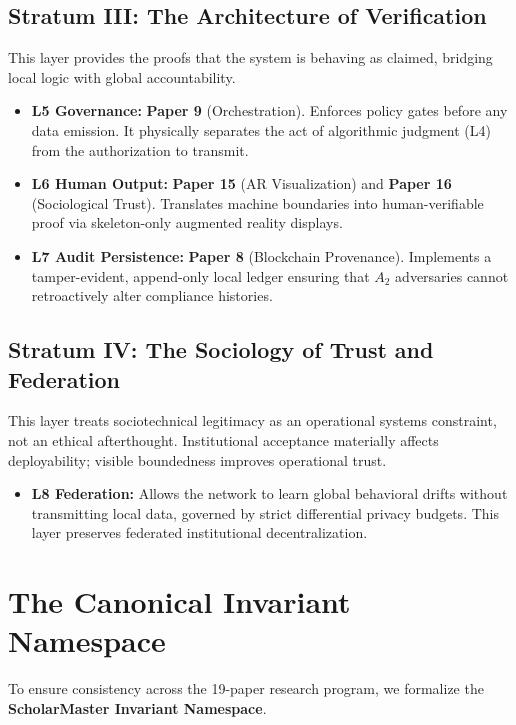 \documentclass[conference]{IEEEtran}
\begin{document}
\subsection{Stratum III: The Architecture of Verification}
This layer provides the proofs that the system is behaving as claimed, bridging local logic with global accountability.
\begin{itemize}
    \item \textbf{L5 Governance:} \textbf{Paper 9} (Orchestration). Enforces policy gates before any data emission. It physically separates the act of algorithmic judgment (L4) from the authorization to transmit.
    \item \textbf{L6 Human Output:} \textbf{Paper 15} (AR Visualization) and \textbf{Paper 16} (Sociological Trust). Translates machine boundaries into human-verifiable proof via skeleton-only augmented reality displays.
    \item \textbf{L7 Audit Persistence:} \textbf{Paper 8} (Blockchain Provenance). Implements a tamper-evident, append-only local ledger ensuring that $A_2$ adversaries cannot retroactively alter compliance histories.
\end{itemize}

\subsection{Stratum IV: The Sociology of Trust and Federation}
This layer treats sociotechnical legitimacy as an operational systems constraint, not an ethical afterthought. Institutional acceptance materially affects deployability; visible boundedness improves operational trust.
\begin{itemize}
    \item \textbf{L8 Federation:} Allows the network to learn global behavioral drifts without transmitting local data, governed by strict differential privacy budgets. This layer preserves federated institutional decentralization.
\end{itemize}

\section{The Canonical Invariant Namespace}

To ensure consistency across the 19-paper research program, we formalize the \textbf{ScholarMaster Invariant Namespace}. 
\end{document}
